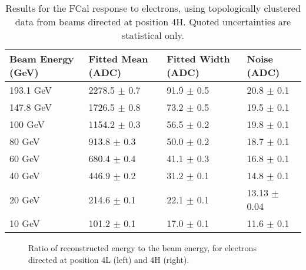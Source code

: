 \begin{table}[!htb]
\begin{center}
\begin{tabular}{|l|l|l|l|}
\hline
Beam Energy (GeV) & Fitted Mean (ADC)& Fitted Width (ADC)& Noise (ADC) \\
\hline
193.1 GeV  &  2278.5 $\pm$     0.7 &    91.9 $\pm$     0.5 &    20.8 $\pm$     0.1 \\
147.8 GeV  &  1726.5 $\pm$     0.8 &    73.2 $\pm$     0.5 &    19.5 $\pm$     0.1 \\
100 GeV  &  1154.2 $\pm$     0.3 &    56.5 $\pm$     0.2 &    19.8 $\pm$     0.1 \\
80 GeV  &   913.8 $\pm$     0.3 &    50.0 $\pm$     0.2 &    18.7 $\pm$     0.1 \\
60 GeV  &   680.4 $\pm$     0.4 &    41.1 $\pm$     0.3 &    16.8 $\pm$     0.1 \\
40 GeV  &   446.9 $\pm$     0.2 &    31.2 $\pm$     0.1 &    14.8 $\pm$     0.1 \\
20 GeV  &   214.6 $\pm$     0.1 &    22.1 $\pm$     0.1 &    13.13 $\pm$     0.04 \\
10 GeV  &   101.2 $\pm$     0.1 &    17.0 $\pm$     0.1 &    11.6 $\pm$     0.1 \\
\hline
\end{tabular}
\end{center}
\caption{Results for the FCal response to electrons, using topologically clustered data from beams directed at position 4H. Quoted uncertainties are statistical only.}

\label{table_electron_response_4H_t420}
\end{table}

\begin{figure}[!htb]
\begin{centering}
\caption{Ratio of reconstructed energy to the beam energy, for electrons directed at position 4L (left) and 4H (right). } 
\label{electron_linearity_t420}
\end{centering}
\end{figure}


